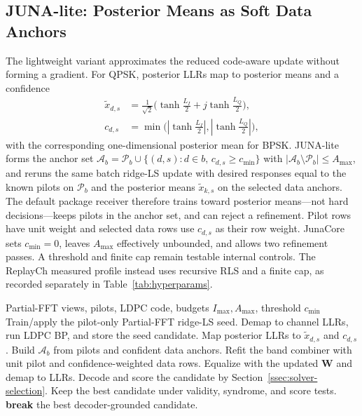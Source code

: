 \documentclass[journal]{IEEEtran}
\newcommand{\abs}[1]{\left\lvert #1 \right\rvert}
\newcommand{\junalite}{JUNA-lite}
\begin{document}
\subsection{\texorpdfstring{\junalite{}}{JUNA-lite}: Posterior Means as Soft Data
Anchors}\label{ssec:junalite}
The lightweight variant approximates the reduced code-aware update without
forming a gradient.
For QPSK, posterior LLRs map to posterior means and a confidence
\begin{equation}
  \begin{aligned}
  \widetilde x_{d,s}
    &=\tfrac{1}{\sqrt2}\big(\tanh\tfrac{L_{I}}{2}
      +j\tanh\tfrac{L_{Q}}{2}\big),\\
  c_{d,s}
    &=\min\!\big(\abs{\tanh\tfrac{L_{I}}{2}},
      \abs{\tanh\tfrac{L_{Q}}{2}}\big),
  \end{aligned}
  \label{eq:qpsk-posterior}
\end{equation}
with the corresponding one-dimensional posterior mean for BPSK.
\junalite{} forms the anchor set $\mathcal A_b=\mathcal P_b\cup\{(d,s):d\in b,\,
c_{d,s}\ge c_{\min}\}$ with $\abs{\mathcal A_b\setminus\mathcal P_b}\le A_{\max}$,
and reruns the same batch ridge-LS update with desired responses equal to the known pilots
on $\mathcal P_b$ and the posterior means $\widetilde x_{k,s}$ on the selected
data anchors. The default package receiver therefore trains toward posterior
means---not hard decisions---keeps pilots in the anchor set, and can reject a
refinement. Pilot rows have unit weight and selected data rows use $c_{d,s}$ as
their row weight. JunaCore sets $c_{\min}=0$, leaves $A_{\max}$ effectively
unbounded, and allows two refinement passes. A threshold and finite cap remain
testable internal controls. The ReplayCh measured profile instead uses recursive
RLS and a finite cap, as recorded separately in Table~\ref{tab:hyperparams}.

\begin{algorithm}[t]
\caption{\junalite{} posterior-anchor batch ridge-LS refinement}
\label{alg:junalite}
\footnotesize
\begin{algorithmic}[1]
\Require Partial-FFT views, pilots, LDPC code, budgets \(I_{\max},A_{\max}\),
  threshold \(c_{\min}\)
\State Train/apply the pilot-only Partial-FFT ridge-LS seed.
\State Demap to channel LLRs, run LDPC BP, and store the seed candidate.
  \State Map posterior LLRs to \(\widetilde x_{d,s}\) and \(c_{d,s}\).
    \State Build \(\mathcal A_b\) from pilots and confident data anchors.
    \State Refit the band combiner with unit pilot and confidence-weighted data rows.
  \EndFor
  \State Equalize with the updated \(\mathbf W\) and demap to LLRs.
  \State Decode and score the candidate by Section~\ref{ssec:solver-selection}.
  \State Keep the best candidate under validity, syndrome, and score tests.
    \State \textbf{break}
  \EndIf
\EndFor
\State \Return the best decoder-grounded candidate.
\end{algorithmic}
\end{algorithm}
\end{document}
